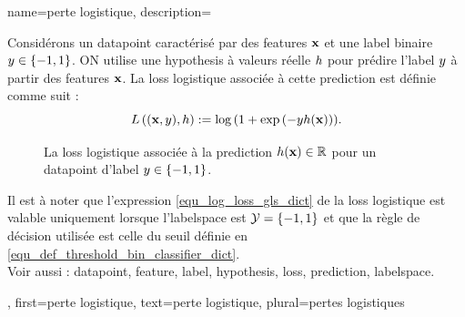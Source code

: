 {name={perte logistique}, 
	description={Considérons 
		un \gls{datapoint} caractérisé par des \glspl{feature} ${\bf x}$ et une \gls{label} binaire $y \in \{-1,1\}$. 
		ON utilise une \gls{hypothesis} à valeurs réelle $h$ pour prédire l’\gls{label} $y$ à partir des 
		\glspl{feature} ${\bf x}$. La \gls{loss} logistique associée à cette \gls{prediction} est définie comme suit :
		\begin{equation} 
			\label{equ_log_loss_gls_dict}
			L\left(({\bf x},y),h \right) :=  \log\, ( 1 + \exp\,(- y h({\bf x}))).
		\end{equation}
		\begin{figure}[H]
			\begin{center}
				\caption{La \gls{loss} logistique associée à la \gls{prediction} $h({\bf x}) \in \mathbb{R}$ 
					pour un \gls{datapoint} d'\gls{label} $y \in \{-1,1\}$.}
				\label{fig_logloss_dict}
			\end{center}
		\end{figure}
		Il est à noter que l’expression \eqref{equ_log_loss_gls_dict} de la \gls{loss} logistique 
		est valable uniquement lorsque l’\gls{labelspace} est $\mathcal{Y} = \{ -1,1\}$ 
		et que la règle de décision utilisée est celle du seuil définie en \eqref{equ_def_threshold_bin_classifier_dict}.
		\\
		Voir aussi : \gls{datapoint}, \gls{feature}, \gls{label}, \gls{hypothesis}, \gls{loss}, \gls{prediction}, \gls{labelspace}.},
	first={perte logistique},
	text={perte logistique}, plural={pertes logistiques}
}

